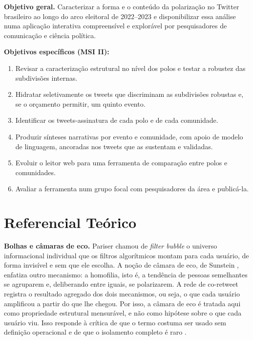 \documentclass[12pt,a4paper,oneside]{article}
\begin{document}
\textbf{Objetivo geral.} Caracterizar a forma e o conteúdo da polarização no Twitter brasileiro ao longo do arco eleitoral de 2022–2023 e disponibilizar essa análise numa aplicação interativa compreensível e explorável por pesquisadores de comunicação e ciência política.

\textbf{Objetivos específicos (MSI II):}

\begin{enumerate}
\item Revisar a caracterização estrutural no nível dos polos e testar a robustez das subdivisões internas.
\item Hidratar seletivamente os tweets que discriminam as subdivisões robustas e, se o orçamento permitir, um quinto evento.
\item Identificar os tweets-assinatura de cada polo e de cada comunidade.
\item Produzir sínteses narrativas por evento e comunidade, com apoio de modelo de linguagem, ancoradas nos tweets que as sustentam e validadas.
\item Evoluir o leitor web para uma ferramenta de comparação entre polos e comunidades.
\item Avaliar a ferramenta num grupo focal com pesquisadores da área e publicá-la.
\end{enumerate}


\section{Referencial Teórico}

\textbf{Bolhas e câmaras de eco.} Pariser \cite{pariser2012} chamou de \emph{filter bubble} o universo informacional individual que os filtros algorítmicos montam para cada usuário, de forma invisível e sem que ele escolha. A noção de câmara de eco, de Sunstein \cite{sunstein2017}, enfatiza outro mecanismo: a homofilia, isto é, a tendência de pessoas semelhantes se agruparem e, deliberando entre iguais, se polarizarem. A rede de co-retweet registra o resultado agregado dos dois mecanismos, ou seja, o que cada usuário amplificou a partir do que lhe chegou. Por isso, a câmara de eco é tratada aqui como propriedade estrutural mensurável, e não como hipótese sobre o que cada usuário viu. Isso responde à crítica de que o termo costuma ser usado sem definição operacional e de que o isolamento completo é raro \cite{recuero2021}.
\end{document}
